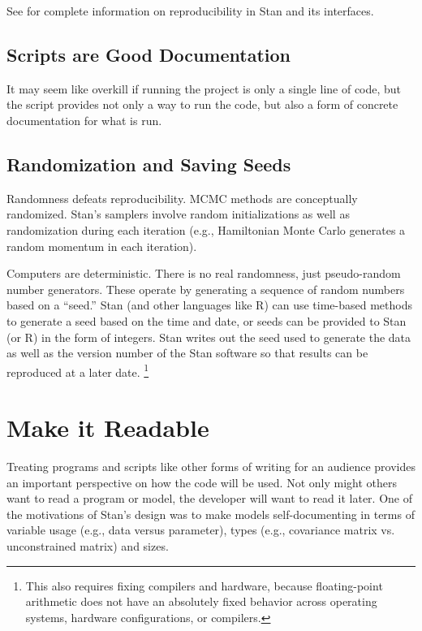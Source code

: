 See  for complete information on
reproducibility in Stan and its interfaces.

\subsection{Scripts are Good Documentation}

It may seem like overkill if running the project is only a single line
of code, but the script provides not only a way to run the code, but
also a form of concrete documentation for what is run.


\subsection{Randomization and Saving Seeds}

Randomness defeats reproducibility.  MCMC methods are conceptually
randomized.  Stan's samplers involve random initializations as well as
randomization during each iteration (e.g., Hamiltonian Monte Carlo
generates a random momentum in each iteration).

Computers are deterministic.  There is no real randomness, just
pseudo-random number generators.  These operate by generating a
sequence of random numbers based on a ``seed.''  Stan (and other
languages like R) can use time-based methods to generate a seed based
on the time and date, or seeds can be provided to Stan (or R) in the
form of integers.  Stan writes out the seed used to generate the
data as well as the version number of the Stan software so that
results can be reproduced at a later date.%
%
\footnote{This also requires fixing compilers and hardware, because
  floating-point arithmetic does not have an absolutely fixed behavior
  across operating systems, hardware configurations, or compilers.}



\section{Make it Readable}

Treating programs and scripts like other forms of writing for an
audience provides an important perspective on how the code will be
used.  Not only might others want to read a program or model, the
developer will want to read it later.  One of the motivations of
Stan's design was to make models self-documenting in terms of variable
usage (e.g., data versus parameter), types (e.g., covariance matrix
vs. unconstrained matrix) and sizes.

